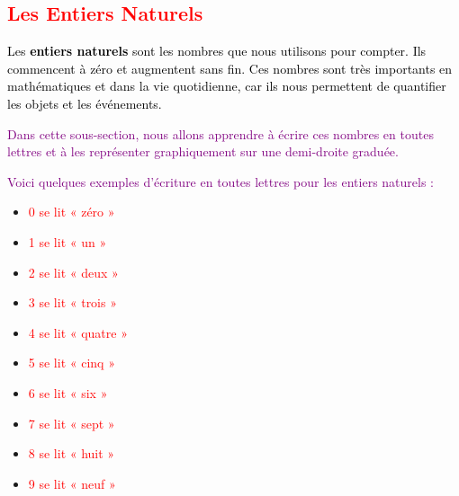\documentclass{article}
\begin{document}
\subsection{\textcolor{red}{Les Entiers Naturels}}

\vspace{0.5cm}

\begin{tcolorbox}[colback=cyan!10!white, colframe=red!75!black, title=\textcolor{white}{Définition}, sharp corners=southwest]
\textcolor{black}{Les \textbf{entiers naturels} sont les nombres que nous utilisons pour compter. Ils commencent à zéro et augmentent sans fin. Ces nombres sont très importants en mathématiques et dans la vie quotidienne, car ils nous permettent de quantifier les objets et les événements.}
\end{tcolorbox}

\vspace{0.5cm}

\textcolor{purple}{Dans cette sous-section, nous allons apprendre à écrire ces nombres en toutes lettres et à les représenter graphiquement sur une demi-droite graduée.}

\vspace{0.5cm}

\begin{tcolorbox}[colback=orange!10!white, colframe=orange!75!black, title=\textcolor{white}{Exemples}, sharp corners=southwest]
\textcolor{purple}{Voici quelques exemples d'écriture en toutes lettres pour les entiers naturels :}
\begin{itemize}
    \item \textcolor{red}{0 se lit « zéro »}
    \item \textcolor{red}{1 se lit « un »}
    \item \textcolor{red}{2 se lit « deux »}
    \item \textcolor{red}{3 se lit « trois »}
    \item \textcolor{red}{4 se lit « quatre »}
    \item \textcolor{red}{5 se lit « cinq »}
    \item \textcolor{red}{6 se lit « six »}
    \item \textcolor{red}{7 se lit « sept »}
    \item \textcolor{red}{8 se lit « huit »}
    \item \textcolor{red}{9 se lit « neuf »}
\end{itemize}
\end{tcolorbox}
\end{document}
